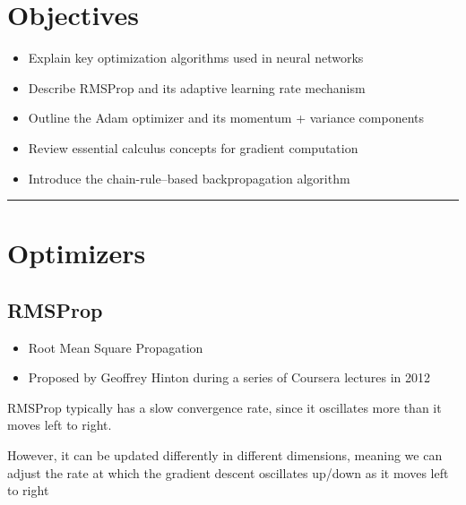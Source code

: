 
\section*{Objectives}
\begin{itemize}
    \item Explain key optimization algorithms used in neural networks
    \item Describe RMSProp and its adaptive learning rate mechanism
    \item Outline the Adam optimizer and its momentum + variance components
    \item Review essential calculus concepts for gradient computation
    \item Introduce the chain-rule–based backpropagation algorithm
\end{itemize}

\rule[0.0051in]{\textwidth}{0.00025in}
\section{Optimizers}
\subsection{RMSProp}

\begin{itemize}
    \item Root Mean Square Propagation
    \item Proposed by Geoffrey Hinton during a series of Coursera lectures in 2012
\end{itemize}
RMSProp typically has a slow convergence rate, since it oscillates more than it moves left to right.

However, it can be updated differently in different dimensions, meaning we can adjust the rate at which the gradient descent oscillates up/down as it moves left to right

